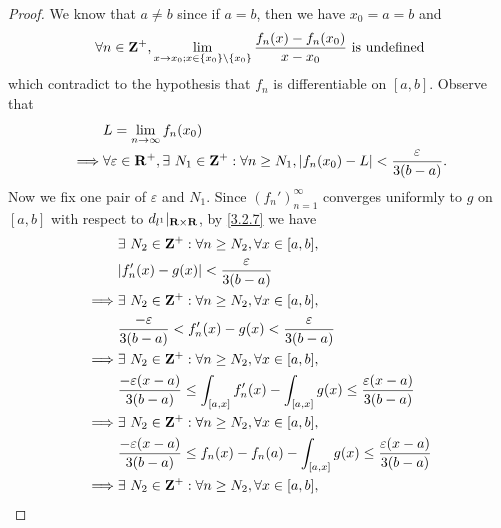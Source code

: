 \begin{proof}
  We know that \(a \neq b\) since if \(a = b\), then we have \(x_0 = a = b\) and
  \[
    \forall n \in \mathbf{Z}^+, \lim_{x \to x_0; x \in \{x_0\} \setminus \{x_0\}} \frac{f_n(x) - f_n(x_0)}{x - x_0} \text{ is undefined}
  \]
  which contradict to the hypothesis that \(f_n\) is differentiable on \([a, b]\).
  Observe that
  \begin{align*}
             & L = \lim_{n \to \infty} f_n(x_0)                                                                                             \\
    \implies & \forall \varepsilon \in \mathbf{R}^+, \exists\ N_1 \in \mathbf{Z}^+ : \forall n \geq N_1, \left\lvert f_n(x_0) - L\right\rvert < \frac{\varepsilon}{3(b - a)}.
  \end{align*}
  Now we fix one pair of \(\varepsilon\) and \(N_1\).
  Since \((f_n')_{n = 1}^\infty\) converges uniformly to \(g\) on \([a, b]\) with respect to \(d_{l^1}|_{\mathbf{R} \times \mathbf{R}}\), by \cref{3.2.7} we have
  \begin{align*}
             & \exists\ N_2 \in \Z^+ : \forall n \geq N_2, \forall x \in [a, b],                                                               \\
             & \abs{f_n'(x) - g(x)} < \frac{\varepsilon}{3(b - a)}                                                                             \\
    \implies & \exists\ N_2 \in \Z^+ : \forall n \geq N_2, \forall x \in [a, b],                                                               \\
             & \frac{-\varepsilon}{3(b - a)} < f_n'(x) - g(x) < \frac{\varepsilon}{3(b - a)}                                                   \\
    \implies & \exists\ N_2 \in \Z^+ : \forall n \geq N_2, \forall x \in [a, b],                                                               \\
             & \frac{-\varepsilon (x - a)}{3(b - a)} \leq \int_{[a, x]} f_n'(x) - \int_{[a, x]} g(x) \leq \frac{\varepsilon (x - a)}{3(b - a)} \\
    \implies & \exists\ N_2 \in \Z^+ : \forall n \geq N_2, \forall x \in [a, b],                                                               \\
             & \frac{-\varepsilon (x - a)}{3(b - a)} \leq f_n(x) - f_n(a) - \int_{[a, x]} g(x) \leq \frac{\varepsilon (x - a)}{3(b - a)}       \\
    \implies & \exists\ N_2 \in \Z^+ : \forall n \geq N_2, \forall x \in [a, b],                                                               \\

\end{align*}
\end{proof}
